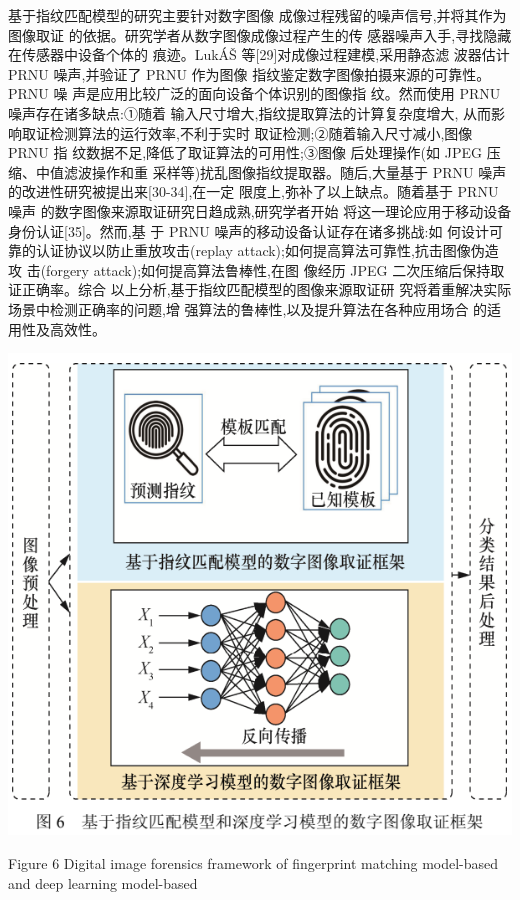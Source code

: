 \documentclass{article}
\begin{document}
基于指纹匹配模型的研究主要针对数字图像 成像过程残留的噪声信号,并将其作为图像取证 的依据。研究学者从数字图像成像过程产生的传 感器噪声入手,寻找隐藏在传感器中设备个体的 痕迹。LukÁŠ 等[29]对成像过程建模,采用静态滤 波器估计 PRNU 噪声,并验证了 PRNU 作为图像 指纹鉴定数字图像拍摄来源的可靠性。PRNU 噪 声是应用比较广泛的面向设备个体识别的图像指 纹。然而使用 PRNU 噪声存在诸多缺点:①随着 输入尺寸增大,指纹提取算法的计算复杂度增大, 从而影响取证检测算法的运行效率,不利于实时 取证检测;②随着输入尺寸减小,图像 PRNU 指 纹数据不足,降低了取证算法的可用性;③图像 后处理操作(如 JPEG 压缩、中值滤波操作和重 采样等)扰乱图像指纹提取器。随后,大量基于 PRNU 噪声的改进性研究被提出来[30-34],在一定 限度上,弥补了以上缺点。随着基于 PRNU 噪声 的数字图像来源取证研究日趋成熟,研究学者开始 将这一理论应用于移动设备身份认证[35]。然而,基 于 PRNU 噪声的移动设备认证存在诸多挑战:如 何设计可靠的认证协议以防止重放攻击(replay attack);如何提高算法可靠性,抗击图像伪造攻 击(forgery attack);如何提高算法鲁棒性,在图 像经历 JPEG 二次压缩后保持取证正确率。综合 以上分析,基于指纹匹配模型的图像来源取证研 究将着重解决实际场景中检测正确率的问题,增 强算法的鲁棒性,以及提升算法在各种应用场合 的适用性及高效性。


\includegraphics{_page_5_Figure_7.png}


Figure 6 Digital image forensics framework of fingerprint matching model-based and deep learning model-based
\end{document}
